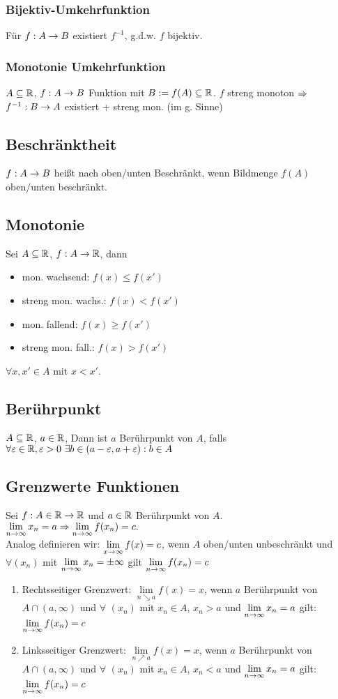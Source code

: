 \subsubsection*{Bijektiv-Umkehrfunktion}
Für $f: A \rightarrow B$ existiert $f^{-1}$, g.d.w. $f$ bijektiv.
\subsubsection*{Monotonie Umkehrfunktion}
$A \subseteq \mathbb R$, $f: A \rightarrow B$ Funktion mit $B := f(A) \subseteq \mathbb R$. $f$ streng monoton $\Rightarrow$ $f^{-1}:B \rightarrow A$ existiert + streng mon. (im g. Sinne)
\subsection*{Beschränktheit}
$f: A \rightarrow B$ heißt nach oben/unten Beschränkt, wenn Bildmenge $f(A)$ oben/unten beschränkt.
\subsection*{Monotonie}
Sei $A \subseteq \mathbb R$, $f: A \rightarrow \mathbb R$, dann
\begin{itemize}[leftmargin=*, noitemsep]
    \item mon. wachsend: $f(x) \leq f(x')$
    \item streng mon. wachs.: $f(x) < f(x')$
    \item mon. fallend: $f(x) \geq f(x')$
    \item streng mon. fall.: $f(x) > f(x')$
\end{itemize}
$\forall x, x' \in A$ mit $x < x'$.
\subsection*{Berührpunkt}
$A \subseteq \mathbb R$, $a \in \mathbb R$, Dann ist $a$ Berührpunkt von $A$, falls $\forall \varepsilon \in \mathbb R, \varepsilon > 0 \ \exists b \in  (a - \varepsilon, a + \varepsilon): b \in A$
\subsection*{Grenzwerte Funktionen}
Sei $f: A\in \mathbb R \rightarrow \mathbb R$ und $a \in \mathbb R$ Berührpunkt von $A$. $\lim\limits_{n \rightarrow \infty} x_n = a \Rightarrow \lim\limits_{n \rightarrow \infty} f(x_n) = c.$\\
Analog definieren wir:
 $\lim\limits_{x \rightarrow \infty} f(x) = c$, wenn $A$ oben/unten unbeschränkt und $\forall (x_n)$ mit $\lim\limits_{n \rightarrow \infty} x_n = \pm\infty$ gilt $\lim\limits_{n \rightarrow \infty} f(x_n) = c$\\
 \begin{enumerate}[label=\arabic*., noitemsep]
     \item Rechtsseitiger Grenzwert: $\lim\limits_{n \searrow a} f(x) = x$, wenn $a$ Berührpunkt von $A \cap (a, \infty)$ und $\forall$ $(x_n)$ mit $x_n \in A$, $x_n > a$ und $\lim\limits_{n \rightarrow \infty} x_n = a$ gilt: $\lim\limits_{n \rightarrow \infty} f(x_n) = c$
     \item Linksseitiger Grenzwert: $\lim\limits_{n \nearrow a} f(x) = x$, wenn $a$ Berührpunkt von $A \cap (a, \infty)$ und $\forall$ $(x_n)$ mit $x_n \in A$, $x_n < a$ und $\lim\limits_{n \rightarrow \infty} x_n = a$ gilt: $\lim\limits_{n \rightarrow \infty} f(x_n) = c$
 \end{enumerate}
